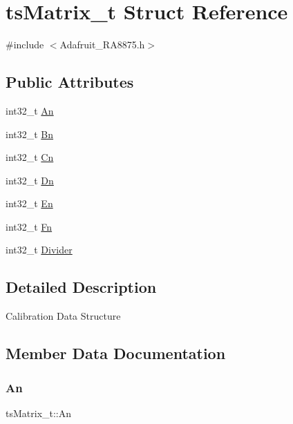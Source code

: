 \hypertarget{structts_matrix__t}{}\section{ts\+Matrix\+\_\+t Struct Reference}
\label{structts_matrix__t}


{\ttfamily \#include $<$Adafruit\+\_\+\+R\+A8875.\+h$>$}

\subsection*{Public Attributes}
\begin{DoxyCompactItemize}
\item 
int32\+\_\+t \mbox{\hyperlink{structts_matrix__t_aebc93d1c42cd285115e36a8fa209e106}{An}}
\item 
int32\+\_\+t \mbox{\hyperlink{structts_matrix__t_a076e25864e535948424cfde2d83fbfbf}{Bn}}
\item 
int32\+\_\+t \mbox{\hyperlink{structts_matrix__t_ae78987caa645ebf0cb23a8ff3573cd71}{Cn}}
\item 
int32\+\_\+t \mbox{\hyperlink{structts_matrix__t_ad9780639ef31bc5bdffde56ab19ac910}{Dn}}
\item 
int32\+\_\+t \mbox{\hyperlink{structts_matrix__t_a9e0f5c7c60ee882421baa8b1dd4fd8a2}{En}}
\item 
int32\+\_\+t \mbox{\hyperlink{structts_matrix__t_a1149b82092ab4feb4b71c08f0ac092a5}{Fn}}
\item 
int32\+\_\+t \mbox{\hyperlink{structts_matrix__t_a1c879e517615bca37280e8457e0d4497}{Divider}}
\end{DoxyCompactItemize}


\subsection{Detailed Description}
Calibration Data Structure 

\subsection{Member Data Documentation}
\mbox{\label{structts_matrix__t_aebc93d1c42cd285115e36a8fa209e106}} 
\subsubsection{\texorpdfstring{An}{An}}
{\footnotesize\ttfamily ts\+Matrix\+\_\+t\+::\+An}

